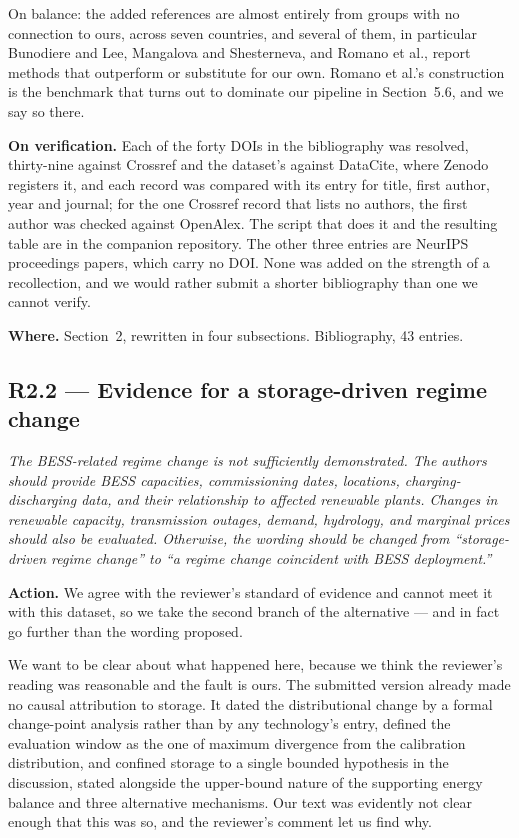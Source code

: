 \documentclass[11pt,a4paper]{article}
\newenvironment{revcomment}
  {\begin{mdframed}[backgroundcolor=quotebg,linecolor=quoterule,linewidth=0.4pt,
    innertopmargin=6pt,innerbottommargin=6pt,skipabove=8pt,skipbelow=8pt]\itshape}
  {\end{mdframed}}
\newcommand{\action}[1]{\textbf{Action.} #1}
\newcommand{\where}[1]{\textbf{Where.} #1}
\begin{document}
On balance: the added references are almost entirely from groups with no connection to ours, across seven countries, and several of them, in particular Bunodiere and Lee, Mangalova and Shesterneva, and Romano et al., report methods that outperform or substitute for our own. Romano et al.'s construction is the benchmark that turns out to dominate our pipeline in Section~5.6, and we say so there.

\textbf{On verification.} Each of the forty DOIs in the bibliography was resolved, thirty-nine against Crossref and the dataset's against DataCite, where Zenodo registers it, and each record was compared with its entry for title, first author, year and journal; for the one Crossref record that lists no authors, the first author was checked against OpenAlex. The script that does it and the resulting table are in the companion repository. The other three entries are NeurIPS proceedings papers, which carry no DOI. None was added on the strength of a recollection, and we would rather submit a shorter bibliography than one we cannot verify.

\where{Section~2, rewritten in four subsections. Bibliography, 43 entries.}

\subsection*{R2.2 --- Evidence for a storage-driven regime change}

\begin{revcomment}
The BESS-related regime change is not sufficiently demonstrated. The authors should provide BESS capacities, commissioning dates, locations, charging-discharging data, and their relationship to affected renewable plants. Changes in renewable capacity, transmission outages, demand, hydrology, and marginal prices should also be evaluated. Otherwise, the wording should be changed from ``storage-driven regime change'' to ``a regime change coincident with BESS deployment.''
\end{revcomment}

\action{We agree with the reviewer's standard of evidence and cannot meet it with this dataset, so we take the second branch of the alternative --- and in fact go further than the wording proposed.}

We want to be clear about what happened here, because we think the reviewer's reading was reasonable and the fault is ours. The submitted version already made no causal attribution to storage. It dated the distributional change by a formal change-point analysis rather than by any technology's entry, defined the evaluation window as the one of maximum divergence from the calibration distribution, and confined storage to a single bounded hypothesis in the discussion, stated alongside the upper-bound nature of the supporting energy balance and three alternative mechanisms. Our text was evidently not clear enough that this was so, and the reviewer's comment let us find why.
\end{document}
